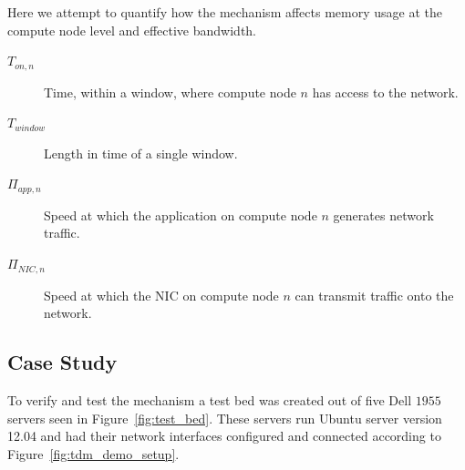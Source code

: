 \documentclass[oneside,12pt]{memoir}
\begin{document}
Here we attempt to quantify how the mechanism affects memory usage at the compute node level and effective bandwidth.
\begin{description}
    \item[$T_{on, n}$] Time, within a window, where compute node $n$ has access to the network.
    \item[$T_{window}$] Length in time of a single window.
    \item[$\Pi_{app, n}$] Speed at which the application on compute node $n$ generates network traffic.
    \item[$\Pi_{NIC, n}$] Speed at which the NIC on compute node $n$ can transmit traffic onto the network.
\end{description} 

\subsection{Case Study}
To verify and test the mechanism a test bed was created out of five Dell $1955$ servers seen in Figure~\ref{fig:test_bed}. These servers run Ubuntu server version 12.04 and had their network interfaces configured and connected according to Figure~\ref{fig:tdm_demo_setup}. 
\end{document}
